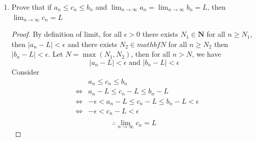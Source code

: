 \documentclass[10pt,letterpaper]{article}
\begin{document}
\begin{enumerate}[label=(\roman{*})]
\begin{proof}
		\end{proof}
		Claim 2:
		\begin{proof}
			Let $\displaystyle\lim_{n\to\infty} a_n = M$. Suppose that $a_n \geq 0$ but $M < 0$. Let
			$$\epsilon = -\dfrac{M}{2}$$
			since $M < 0 \rightarrow -\dfrac{M}{2} > 0 \rightarrow \epsilon > 0$.
			By definition of limit,
			$$|a_n - M| < -\dfrac{M}{2}$$
			which implies $a_n - M < -\dfrac{M}{2} \Leftrightarrow a_n < -\dfrac{M}{2} + M 
			\Leftrightarrow a_n < \dfrac{M}{2}$.
			In other words, $a_n < 0$ which is a contradiction. Therefore,
			$$\displaystyle\lim_{n\to\infty} a_n \geq 0$$ 		 
		\end{proof}
		Now we are ready for the original problem! Consider the sequence $(c_n)$ where
		$$c_n = b_n - a_n$$
		since $b_n > a_n$, we must have $c_n > 0$, then from \textbf{Claim 1} and \textbf{Claim 2} we have
		$$\displaystyle\lim_{n\to\infty} c_n = \displaystyle\lim_{n\to\infty}b_n - \displaystyle\lim_{n\to\infty}a_n = 
		b - a > 0$$
		which implies $b > a$.
		\item Prove that if $a_n \leq c_n \leq b_n$ and $\displaystyle\lim_{n\to \infty}a_n = \displaystyle\lim_{n\to \infty}b_n = L$, then $\displaystyle\lim_{n\to \infty}c_n = L$
		\begin{proof}
			By definition of limit, for all $\epsilon > 0$ there exists $N_1 \in \mathbf{N}$ for all $n \geq N_1$, 
			then $|a_n - L| < \epsilon$ and there exists $N_2 \in mathbf{N}$ for all $n \geq N_2$ then 
			$|b_n - L| < \epsilon$. Let $N = \max(N_1, N_2)$, then for all $n > N$, we have
			$$|a_n - L| < \epsilon \text{ and } |b_n - L| < \epsilon$$
			Consider 
			\begin{eqnarray*}
				&&		a_n \leq c_n \leq b_n \\
	& \Leftrightarrow & a_n - L \leq c_n - L \leq b_n - L \\
	& \Leftrightarrow & -\epsilon < a_n - L \leq c_n - L \leq b_n - L < \epsilon \\
	& \Leftrightarrow & -\epsilon < c_n - L < \epsilon \\    
			\end{eqnarray*}
			$$\therefore \displaystyle\lim_{n\to\infty} c_n = L$$
		\end{proof}
	\end{enumerate}
	
\end{document}
